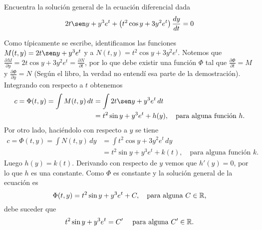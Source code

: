 Encuentra la solución general de la ecuación diferencial dada
\[
    2t \sen y +y^3 e^t + \left( t^2 \cos y + 3 y^2 e ^t \right) \frac{dy}{dt} = 0
\]
\begin{solution}
    Como típicamente se escribe, identificamos las funciones
    \( M(t,y)=2t \sen y +y^3 e^t \) y a \( N(t,y)=t^2\cos y +3y^2 e ^t \).
    Notemos que 
    \( \frac{\partial M}{\partial y} = 2t \cos y + 3 y^2 e^t = \frac{\partial N}{\partial t} \),
    por lo que debe existir una función \( \Phi \) tal que \( \frac{\partial \Phi}{\partial t} =
    M\) y \( \frac{\partial \Phi}{\partial y} = N \) (Según el libro, la verdad no entendí 
    esa parte de la demostración).
    Integrando con respecto a \( t \) obtenemos 
    \begin{align*}
        c=\Phi(t,y)
        =
        \int M(t,y)
        \, dt
        &=
        \int 2t \sen y +y^3 e^t
        \, dt\\
        &=
        t^2\sin y+y^3 e^t + h(y),\quad\text{para alguna función $h$.}
    \end{align*}
    Por otro lado, haciéndolo con respecto a \( y \) se tiene
    \begin{align*}
        c=\Phi(t,y)=
        \int N(t,y)
        \, dy
        &=
        \int 
        t^2 \cos y +3y^2 e^t
        \, dy\\
        &=
        t^2 \sin y +y^3 e^t + k(t),\quad\text{para alguna función $k$.}
    \end{align*}
    Luego $h(y)=k(t)$. Derivando con respecto de $y$ vemos que $h'(y)=0$, por lo que $h$ es 
    una constante. Como \( \Phi \) es constante y la solución general de la ecuación es 
    \[
        \Phi(t,y)
        =
        t^2\sin y + y^3 e^t + C,\quad\text{para alguna $C\in\mathbb{R}$,}
    \]
    debe suceder que
    \[
        t^2 \sin y + y^3 e^t = C'\quad\text{ para alguna $C'\in\mathbb{R}$.}
    \]
\end{solution}
